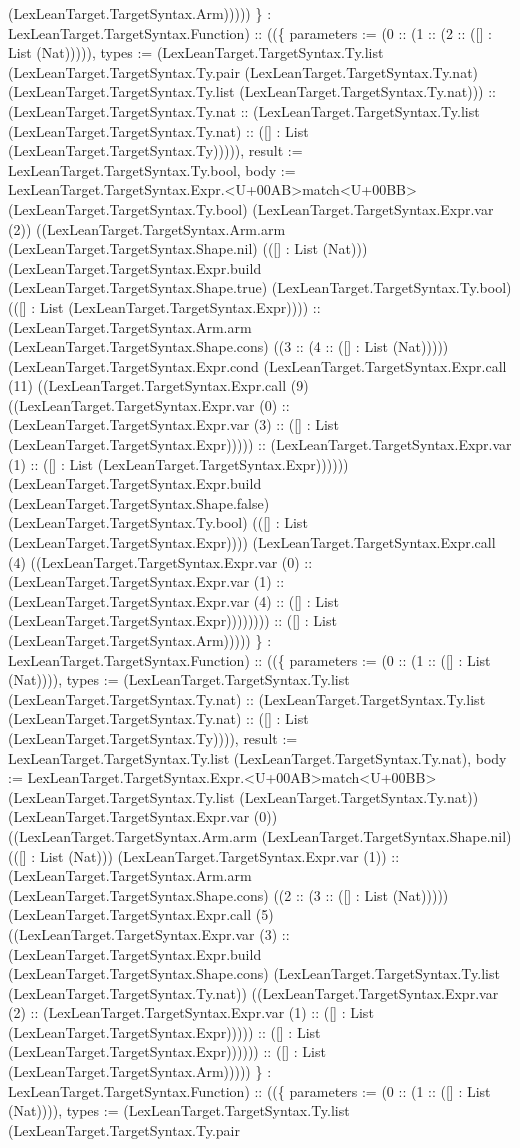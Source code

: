 \documentclass[11pt]{article}
\begin{document}
(LexLeanTarget.TargetSyntax.Arm))))) \} : LexLeanTarget.TargetSyntax.Function) :: ((\{ parameters := (0 :: (1 :: (2 :: ([] : List (Nat))))), types := (LexLeanTarget.TargetSyntax.Ty.list (LexLeanTarget.TargetSyntax.Ty.pair (LexLeanTarget.TargetSyntax.Ty.nat) (LexLeanTarget.TargetSyntax.Ty.list (LexLeanTarget.TargetSyntax.Ty.nat))) :: (LexLeanTarget.TargetSyntax.Ty.nat :: (LexLeanTarget.TargetSyntax.Ty.list (LexLeanTarget.TargetSyntax.Ty.nat) :: ([] : List (LexLeanTarget.TargetSyntax.Ty))))), result := LexLeanTarget.TargetSyntax.Ty.bool, body := LexLeanTarget.TargetSyntax.Expr.<U+00AB>match<U+00BB> (LexLeanTarget.TargetSyntax.Ty.bool) (LexLeanTarget.TargetSyntax.Expr.var (2)) ((LexLeanTarget.TargetSyntax.Arm.arm (LexLeanTarget.TargetSyntax.Shape.nil) (([] : List (Nat))) (LexLeanTarget.TargetSyntax.Expr.build (LexLeanTarget.TargetSyntax.Shape.true) (LexLeanTarget.TargetSyntax.Ty.bool) (([] : List (LexLeanTarget.TargetSyntax.Expr)))) :: (LexLeanTarget.TargetSyntax.Arm.arm (LexLeanTarget.TargetSyntax.Shape.cons) ((3 :: (4 :: ([] : List (Nat))))) (LexLeanTarget.TargetSyntax.Expr.cond (LexLeanTarget.TargetSyntax.Expr.call (11) ((LexLeanTarget.TargetSyntax.Expr.call (9) ((LexLeanTarget.TargetSyntax.Expr.var (0) :: (LexLeanTarget.TargetSyntax.Expr.var (3) :: ([] : List (LexLeanTarget.TargetSyntax.Expr))))) :: (LexLeanTarget.TargetSyntax.Expr.var (1) :: ([] : List (LexLeanTarget.TargetSyntax.Expr)))))) (LexLeanTarget.TargetSyntax.Expr.build (LexLeanTarget.TargetSyntax.Shape.false) (LexLeanTarget.TargetSyntax.Ty.bool) (([] : List (LexLeanTarget.TargetSyntax.Expr)))) (LexLeanTarget.TargetSyntax.Expr.call (4) ((LexLeanTarget.TargetSyntax.Expr.var (0) :: (LexLeanTarget.TargetSyntax.Expr.var (1) :: (LexLeanTarget.TargetSyntax.Expr.var (4) :: ([] : List (LexLeanTarget.TargetSyntax.Expr)))))))) :: ([] : List (LexLeanTarget.TargetSyntax.Arm))))) \} : LexLeanTarget.TargetSyntax.Function) :: ((\{ parameters := (0 :: (1 :: ([] : List (Nat)))), types := (LexLeanTarget.TargetSyntax.Ty.list (LexLeanTarget.TargetSyntax.Ty.nat) :: (LexLeanTarget.TargetSyntax.Ty.list (LexLeanTarget.TargetSyntax.Ty.nat) :: ([] : List (LexLeanTarget.TargetSyntax.Ty)))), result := LexLeanTarget.TargetSyntax.Ty.list (LexLeanTarget.TargetSyntax.Ty.nat), body := LexLeanTarget.TargetSyntax.Expr.<U+00AB>match<U+00BB> (LexLeanTarget.TargetSyntax.Ty.list (LexLeanTarget.TargetSyntax.Ty.nat)) (LexLeanTarget.TargetSyntax.Expr.var (0)) ((LexLeanTarget.TargetSyntax.Arm.arm (LexLeanTarget.TargetSyntax.Shape.nil) (([] : List (Nat))) (LexLeanTarget.TargetSyntax.Expr.var (1)) :: (LexLeanTarget.TargetSyntax.Arm.arm (LexLeanTarget.TargetSyntax.Shape.cons) ((2 :: (3 :: ([] : List (Nat))))) (LexLeanTarget.TargetSyntax.Expr.call (5) ((LexLeanTarget.TargetSyntax.Expr.var (3) :: (LexLeanTarget.TargetSyntax.Expr.build (LexLeanTarget.TargetSyntax.Shape.cons) (LexLeanTarget.TargetSyntax.Ty.list (LexLeanTarget.TargetSyntax.Ty.nat)) ((LexLeanTarget.TargetSyntax.Expr.var (2) :: (LexLeanTarget.TargetSyntax.Expr.var (1) :: ([] : List (LexLeanTarget.TargetSyntax.Expr))))) :: ([] : List (LexLeanTarget.TargetSyntax.Expr)))))) :: ([] : List (LexLeanTarget.TargetSyntax.Arm))))) \} : LexLeanTarget.TargetSyntax.Function) :: ((\{ parameters := (0 :: (1 :: ([] : List (Nat)))), types := (LexLeanTarget.TargetSyntax.Ty.list (LexLeanTarget.TargetSyntax.Ty.pair 
\end{document}
